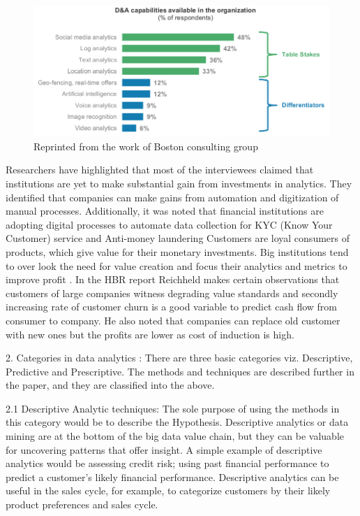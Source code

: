 \begin{figure}[H]
	\includegraphics[scale = 0.5]{figures/DA_capabilities.png}
	\caption[Da capablities]{Reprinted from the work of Boston consulting group  }
	\label{fig:da_capabilities}
\end{figure}

Researchers have highlighted that most of the interviewees claimed that institutions are yet to make substantial gain from investments in analytics. They identified that companies can make gains from automation and digitization of manual processes. Additionally, it was noted that financial institutions are adopting digital processes to automate data collection for KYC (Know Your Customer) service and Anti-money laundering 
Customers are loyal consumers of products, which give value for their monetary investments. Big institutions tend to over look the need for value creation and focus their analytics and metrics to improve profit . In the HBR report Reichheld makes certain  observations that customers of large companies witness degrading value standards and secondly increasing rate of customer churn is a good variable to predict cash flow from consumer to company. He also noted that companies can replace old customer with new ones but the profits are lower as cost of induction is high.


	

2. Categories in data analytics :
There are three basic categories viz. Descriptive, Predictive and Prescriptive. The methods and techniques are described further in the paper, and they are classified into the above.

2.1 Descriptive Analytic techniques: The sole purpose of using the methods in this category would be to describe the Hypothesis. Descriptive analytics or data mining are at the bottom of the big data value chain, but they can be valuable for uncovering patterns that offer insight. A simple example of descriptive analytics would be assessing credit risk; using past financial performance to predict a customer’s likely financial performance. Descriptive analytics can be useful in the sales cycle, for example, to categorize customers by their likely product preferences and sales cycle.

